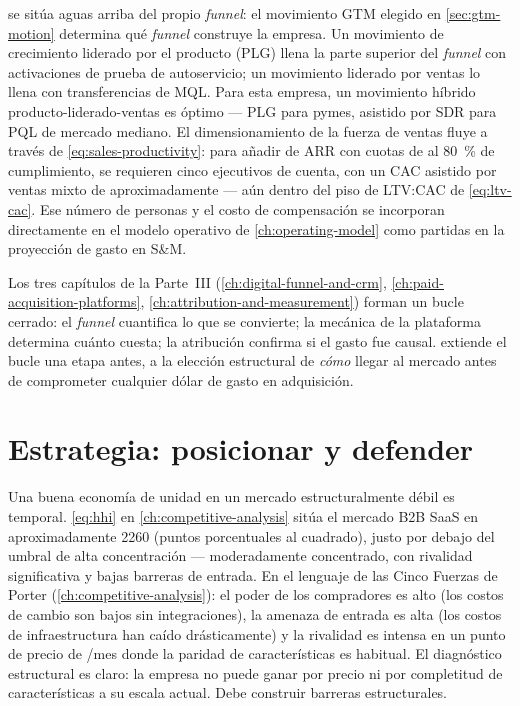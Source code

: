  se sitúa aguas arriba del propio \emph{funnel}: el movimiento
GTM elegido en \cref{sec:gtm-motion} determina qué \emph{funnel} construye la empresa. Un
movimiento de crecimiento liderado por el producto (PLG) llena la parte superior del \emph{funnel}
con activaciones de prueba de autoservicio; un movimiento liderado por ventas lo llena con
transferencias de MQL. Para esta empresa, un movimiento híbrido producto-liderado-ventas es
óptimo --- PLG para pymes, asistido por SDR para PQL de mercado mediano. El dimensionamiento de
la fuerza de ventas fluye a través de \cref{eq:sales-productivity}: para añadir 
de ARR con cuotas de  al \qty{80}{\percent} de cumplimiento, se requieren cinco
ejecutivos de cuenta, con un CAC asistido por ventas mixto de aproximadamente  ---
aún dentro del piso de LTV:CAC de \cref{eq:ltv-cac}. Ese número de personas y el costo de
compensación se incorporan directamente en el modelo operativo de \cref{ch:operating-model}
como partidas en la proyección de gasto en S\&M.

Los tres capítulos de la Parte~III (\cref{ch:digital-funnel-and-crm}, \cref{ch:paid-acquisition-platforms},
\cref{ch:attribution-and-measurement}) forman un bucle cerrado: el \emph{funnel} cuantifica
lo que se convierte; la mecánica de la plataforma determina cuánto cuesta; la atribución
confirma si el gasto fue causal.  extiende el bucle una etapa
antes, a la elección estructural de \emph{cómo} llegar al mercado antes de comprometer
cualquier dólar de gasto en adquisición.

\section{Estrategia: posicionar y defender}\label{sec:capstone-strategy}

Una buena economía de unidad en un mercado estructuralmente débil es temporal.
\cref{eq:hhi} en \cref{ch:competitive-analysis} sitúa el mercado B2B SaaS en aproximadamente
\num{2260} (puntos porcentuales al cuadrado), justo por debajo del umbral de alta concentración
--- moderadamente concentrado, con rivalidad significativa y bajas barreras de entrada. En el
lenguaje de las Cinco Fuerzas de Porter (\cref{ch:competitive-analysis}): el poder de los
compradores es alto (los costos de cambio son bajos sin integraciones), la amenaza de entrada
es alta (los costos de infraestructura han caído drásticamente) y la rivalidad es intensa en un
punto de precio de /mes donde la paridad de características es habitual. El
diagnóstico estructural es claro: la empresa no puede ganar por precio ni por completitud de
características a su escala actual. Debe construir barreras estructurales.


